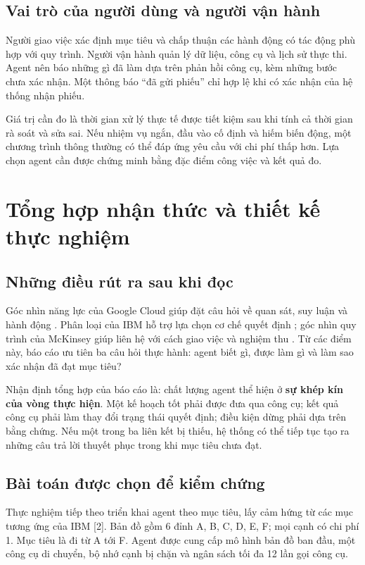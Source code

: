 \documentclass[12pt,a4paper]{article}
\begin{document}
\subsection{Vai trò của người dùng và người vận hành}
Người giao việc xác định mục tiêu và chấp thuận các hành động có tác động phù hợp với
quy trình. Người vận hành quản lý dữ liệu, công cụ và lịch sử thực thi. Agent nên báo
những gì đã làm dựa trên phản hồi công cụ, kèm những bước chưa xác nhận. Một thông báo
``đã gửi phiếu'' chỉ hợp lệ khi có xác nhận của hệ thống nhận phiếu.

Giá trị cần đo là thời gian xử lý thực tế được tiết kiệm sau khi tính cả thời gian rà
soát và sửa sai. Nếu nhiệm vụ ngắn, đầu vào cố định và hiếm biến động, một chương trình
thông thường có thể đáp ứng yêu cầu với chi phí thấp hơn. Lựa chọn agent cần được chứng
minh bằng đặc điểm công việc và kết quả đo.

\par
\section{Tổng hợp nhận thức và thiết kế thực nghiệm}
\subsection{Những điều rút ra sau khi đọc}
Góc nhìn năng lực của Google Cloud giúp đặt câu hỏi về quan sát, suy luận và hành động
\cite{google}. Phân loại của IBM hỗ trợ lựa chọn cơ chế quyết định \cite{ibm}; góc nhìn
quy trình của McKinsey giúp liên hệ với cách giao việc và nghiệm thu \cite{mckinsey}.
Từ các điểm này, báo cáo ưu tiên ba câu hỏi thực hành: agent biết gì, được làm gì và làm
sao xác nhận đã đạt mục tiêu?

Nhận định tổng hợp của báo cáo là: chất lượng agent thể hiện ở \textbf{sự khép kín của vòng
thực hiện}. Một kế hoạch tốt phải được đưa qua công cụ; kết quả công cụ phải làm thay
đổi trạng thái quyết định; điều kiện dừng phải dựa trên bằng chứng. Nếu một trong ba
liên kết bị thiếu, hệ thống có thể tiếp tục tạo ra những câu trả lời thuyết phục trong
khi mục tiêu chưa đạt.

\subsection{Bài toán được chọn để kiểm chứng}
Thực nghiệm tiếp theo triển khai agent theo mục tiêu, lấy cảm hứng từ các mục tương ứng
của IBM [2]. Bản đồ gồm 6 đỉnh A, B, C, D, E, F; mọi cạnh có chi phí 1. Mục tiêu là đi
từ A tới F. Agent được cung cấp mô hình bản đồ ban đầu, một công cụ di chuyển, bộ nhớ
cạnh bị chặn và ngân sách tối đa 12 lần gọi công cụ.
\end{document}
